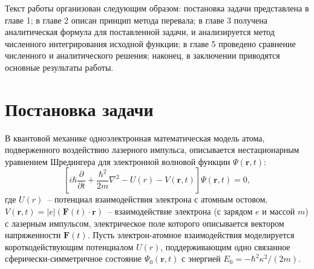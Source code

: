 \documentclass[%
bachelor,    %
natbib,      %
subf,        %
href,        %
colorlinks,  %
]{disser}
\newcommand{\sectionbreak}{\clearpage}
\newcommand{\vF}{\mathbf{F}}
\newcommand{\vr}{\mathbf{r}}
\begin{document}
Текст работы организован следующим образом: постановка задачи представлена в главе 1; в главе 2 описан принцип метода перевала; в главе 3 получена аналитическая формула для поставленной задачи, и анализируется метод численного интегрирования исходной функции; в главе 5 проведено сравнение численного и аналитического решения; наконец, в заключении приводятся основные результаты работы. 
\sectionbreak


\section{Постановка задачи}

В квантовой механике одноэлектронная математическая модель атома, подверженного воздействию
лазерного импульса, описывается нестационарным уравнением Шредингера для электронной волновой функции $\Psi(\vr,t)$:
\begin{equation}
\label{TDSE}
\left[i\hbar\frac{\partial}{\partial t} + \frac{\hbar^2}{2m}\nabla^2 - U(r) - V(\vr,t)\right]\Psi(\vr,t) = 0,
\end{equation}
где $U(r)$~-- потенциал взаимодействия электрона с атомным остовом, $V(\vr,t)=|e|(\vF(t)\cdot\vr)$~-- взаимодействие электрона (с зарядом $e$ и массой $m$) с лазерным импульсом, электрическое поле которого описывается вектором напряженности $\vF(t)$.\cite{7} Пусть электрон-атомное взаимодействия моделируется короткодействующим потенциалом $U(r)$, поддерживающим одно связанное сферически-симметричное состояние $\Psi_0(\vr,t)$ с энергией $E_0=-\hbar^2\kappa^2/(2m)$.
\end{document}

